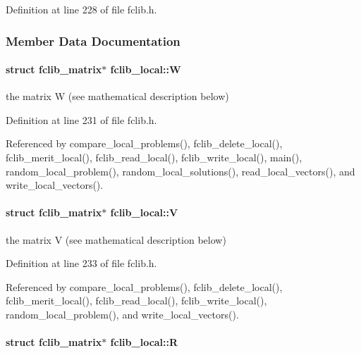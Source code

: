 Definition at line 228 of file fclib.\-h.



\subsubsection{Member Data Documentation}
\hypertarget{structfclib__local_a981b5abb9acf3f99dffe9a05602ad864}{
\paragraph[{W}]{\setlength{\rightskip}{0pt plus 5cm}struct {\bf fclib\-\_\-matrix}$\ast$ fclib\-\_\-local\-::\-W}}\label{structfclib__local_a981b5abb9acf3f99dffe9a05602ad864}


the matrix W (see mathematical description below) 



Definition at line 231 of file fclib.\-h.



Referenced by compare\-\_\-local\-\_\-problems(), fclib\-\_\-delete\-\_\-local(), fclib\-\_\-merit\-\_\-local(), fclib\-\_\-read\-\_\-local(), fclib\-\_\-write\-\_\-local(), main(), random\-\_\-local\-\_\-problem(), random\-\_\-local\-\_\-solutions(), read\-\_\-local\-\_\-vectors(), and write\-\_\-local\-\_\-vectors().

\hypertarget{structfclib__local_a516663ee92260f82283b4933f7e098cf}{
\paragraph[{V}]{\setlength{\rightskip}{0pt plus 5cm}struct {\bf fclib\-\_\-matrix}$\ast$ fclib\-\_\-local\-::\-V}}\label{structfclib__local_a516663ee92260f82283b4933f7e098cf}


the matrix V (see mathematical description below) 



Definition at line 233 of file fclib.\-h.



Referenced by compare\-\_\-local\-\_\-problems(), fclib\-\_\-delete\-\_\-local(), fclib\-\_\-merit\-\_\-local(), fclib\-\_\-read\-\_\-local(), fclib\-\_\-write\-\_\-local(), random\-\_\-local\-\_\-problem(), and write\-\_\-local\-\_\-vectors().

\hypertarget{structfclib__local_ae08751b33a0771d54d48aee48f838ced}{
\paragraph[{R}]{\setlength{\rightskip}{0pt plus 5cm}struct {\bf fclib\-\_\-matrix}$\ast$ fclib\-\_\-local\-::\-R}}\label{structfclib__local_ae08751b33a0771d54d48aee48f838ced}


